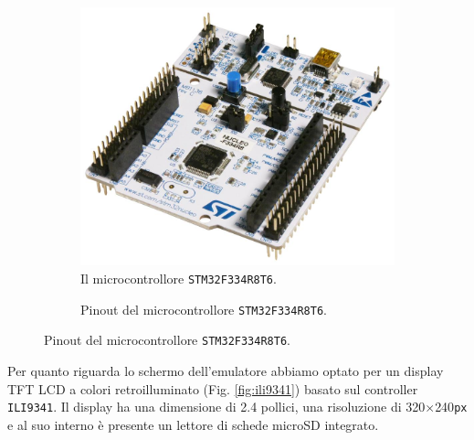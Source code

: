 \documentclass[a4paper]{article}
\begin{document}
\begin{figure}[h!t]
    \begin{subfigure}[b]{0.45\textwidth}
        \begin{center}
            \includegraphics[scale=0.15]{figures/stm32f334.jpg}
        \end{center}
        \caption{Il microcontrollore \texttt{STM32F334R8T6}.}
        \label{fig:stm32f334}
    \end{subfigure}
    \hfill
    \begin{subfigure}[b]{0.45\textwidth}
        \begin{center}
            \begin{tikzpicture}[x=0.015cm, y=0.015cm, scale=0.50, transform shape]
                
            \end{tikzpicture}
        \end{center}
        \caption{Pinout del microcontrollore \texttt{STM32F334R8T6}.}
        \label{fig:pinout_stm32}
    \end{subfigure}
\end{figure}

Per quanto riguarda lo schermo dell'emulatore abbiamo optato per un display TFT LCD
a colori retroilluminato (Fig. \ref{fig:ili9341}) basato sul controller \texttt{ILI9341}.
Il display ha una dimensione di 2.4 pollici, una risoluzione di 320$\times$240\texttt{px} e
al suo interno è presente un lettore di schede microSD integrato.
\end{document}
